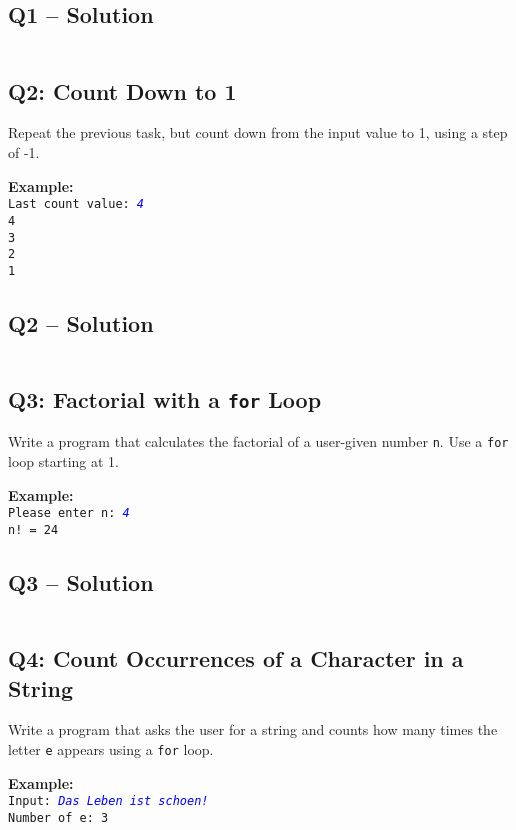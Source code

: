 \documentclass[a4paper,11pt]{article}
\begin{document}
		\subsection*{Q1 – Solution}
	\inputminted{python}{Files/3/1.py}
	
	
	\subsection*{Q2: Count Down to 1}
	Repeat the previous task, but count down from the input value to 1, using a step of -1.
	
	\textbf{Example:}\\
	\texttt{Last count value: \textcolor{blue}{\textit{4}}}\\
	\texttt{4\\3\\2\\1}
	
	
	\subsection*{Q2 – Solution}
	\inputminted{python}{Files/3/2.py}
	
	\subsection*{Q3: Factorial with a \texttt{for} Loop}
	Write a program that calculates the factorial of a user-given number \texttt{n}. Use a \texttt{for} loop starting at 1.
	
	\textbf{Example:}\\
	\texttt{Please enter n: \textcolor{blue}{\textit{4}}}\\
	\texttt{n! = 24}
	
		
	\subsection*{Q3 – Solution}
	\inputminted{python}{Files/3/3.py}
	
	\subsection*{Q4: Count Occurrences of a Character in a String}
	Write a program that asks the user for a string and counts how many times the letter \texttt{e} appears using a \texttt{for} loop.
	
	\textbf{Example:}\\
	\texttt{Input: \textcolor{blue}{\textit{Das Leben ist schoen!}}}\\
	\texttt{Number of e: 3}
	
\end{document}

